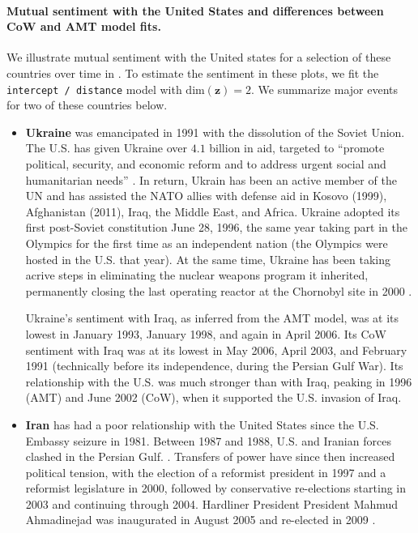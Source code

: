 \paragraph{Mutual sentiment with the United States and differences
 between CoW and AMT model fits.}
We illustrate mutual sentiment with the United states for a selection
of these countries over time in .
To estimate the sentiment in these plots, we fit the
\verb!intercept / distance! model with $\mbox{dim}(\bm z) = 2$.
We summarize major events for two of these countries below.
\begin{itemize}
  \item \textbf{Ukraine} was emancipated in 1991 with the dissolution
    of the Soviet Union.  The U.S. has given Ukraine over $4.1$
    billion in aid, targeted to ``promote political, security, and
    economic reform and to address urgent social and humanitarian
    needs'' \cite{ukrainestate:2012}.  In return, Ukrain has been an
    active member of the UN and has assisted the NATO allies with
    defense aid in Kosovo (1999), Afghanistan (2011), Iraq, the Middle
    East, and Africa.  Ukraine adopted its first post-Soviet
    constitution June 28, 1996, the same year taking part in the
    Olympics for the first time as an independent nation (the Olympics
    were hosted in the U.S. that year).  At the same time, Ukraine has
    been taking acrive steps in eliminating the nuclear weapons
    program it inherited, permanently closing the last operating
    reactor at the Chornobyl site in 2000 \cite{ukrainestate:2012}.

    Ukraine's sentiment with Iraq, as inferred from the AMT model, was
    at its lowest in January 1993, January 1998, and again in April
    2006.  Its CoW sentiment with Iraq was at its lowest in May 2006,
    April 2003, and February 1991 (technically before its
    independence, during the Persian Gulf War). Its relationship with
    the U.S. was much stronger than with Iraq, peaking in 1996 (AMT)
    and June 2002 (CoW), when it supported the U.S. invasion of Iraq.

  \item \textbf{Iran} has had a poor relationship with the United
    States since the U.S. Embassy seizure in 1981.  Between 1987 and
    1988, U.S. and Iranian forces clashed in the Persian Gulf.
    \cite{irancia:2012}.  Transfers of power have since then increased
    political tension, with the election of a reformist president in
    1997 and a reformist legislature in 2000, followed by conservative
    re-elections starting in 2003 and continuing through 2004.
    Hardliner President President Mahmud Ahmadinejad was inaugurated
    in August 2005 and re-elected in 2009 \cite{irancia:2012}.


\end{itemize}
